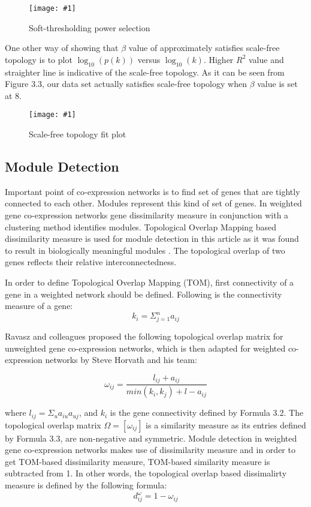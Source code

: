 \documentclass{ba-kecs}
\numberwithin{figure}{section}
\numberwithin{equation}{section}
\newcommand{\dkepic}[2]{ %
	\begin{figure}[H] %
	\texttt{[image: \#1]}
	\caption{#2}
	\label{#1}
	\end{figure}
}
\begin{document}
\dkepic{powerNew}{Soft-thresholding power selection}


One other way of showing that $\beta$ value of approximately satisfies scale-free topology is to plot $\log_10(p(k))$ versus $\log_10(k)$. Higher $R^2$ value and straighter line is indicative of the scale-free topology. As it can be seen from Figure 3.3, our data set actually satisfies scale-free topology when $\beta$ value is set at 8.


\dkepic{scaleFreeNew}{Scale-free topology fit plot}

\subsection{Module Detection}
Important point of co-expression networks is to find set of genes that are tightly connected to each other. Modules represent this kind of set of genes. In weighted gene co-expression networks gene dissimilarity measure in conjunction with a clustering method identifies modules. Topological Overlap Mapping based dissimilarity measure is used for module detection in this article as it was found to result in biologically meaningful modules \cite{ravasz2002}. The topological overlap of two genes reflects their relative interconnectedness.

In order to define Topological Overlap Mapping (TOM), first connectivity of a gene in a weighted network should be defined. Following is the connectivity measure of a gene:
\begin{equation}
k_i = \Sigma_{j=1}^n a_{ij}
\end{equation}

Ravasz and colleagues proposed the following topological overlap matrix for unweighted gene co-expression networks, which is then adapted for weighted co-expression networks by Steve Horvath and his team:

\begin{equation}
\omega _{ij} = \dfrac{l _{ij} + a_{ij}}{min(k_i,k_j) + l - a_{ij}}
\end{equation}

where $l_{ij} = \Sigma_u a_{iu}a_{uj}$, and $k_i$ is the gene connectivity defined by Formula 3.2.  The topological overlap matrix $\Omega = [\omega_{ij}]$ is a similarity measure as its entries defined by Formula 3.3, are non-negative and symmetric. Module detection in weighted gene co-expression networks makes use of dissimilarity measure and in order to get TOM-based dissimilarity measure, TOM-based similarity measure is subtracted from 1. In other words, the topological overlap based dissimalirty measure is defined by the following formula:
\begin{equation}
d^{\omega}_{ij} = 1 - \omega_{ij}
\end{equation}
\end{document}
